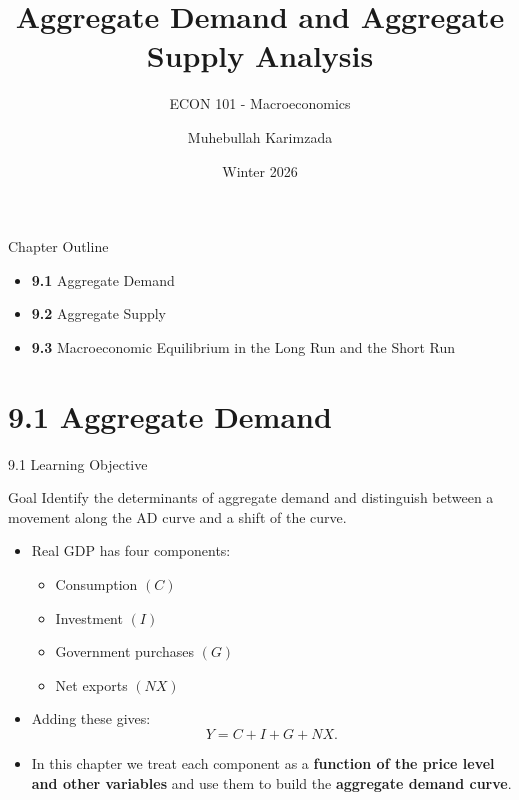 \documentclass[aspectratio=169]{beamer}
\title{\textbf{Aggregate Demand and Aggregate Supply Analysis \vspace{.5cm}\\  }}
\subtitle{ {\large ECON 101 - Macroeconomics}}
\author{Muhebullah Karimzada}
\date{Winter 2026}
\begin{document}
\begin{frame}[plain]
  \titlepage
\end{frame}

\begin{frame}{Chapter Outline}
\transfade
\begin{itemize}
  \item \textbf{9.1} Aggregate Demand
  \item \textbf{9.2} Aggregate Supply
  \item \textbf{9.3} Macroeconomic Equilibrium in the Long Run and the Short Run
\end{itemize}
\end{frame}

\section{9.1 Aggregate Demand}

\begin{frame}{9.1 Learning Objective}
\transfade
\begin{block}{Goal}
Identify the determinants of aggregate demand and distinguish between a movement along the AD curve and a shift of the curve.
\end{block}
\begin{itemize}
  \item Real GDP has four components:
  \begin{itemize}
    \item Consumption \((C)\)
    \item Investment \((I)\)
    \item Government purchases \((G)\)
    \item Net exports \((NX)\)
  \end{itemize}
  \item Adding these gives:
  \[
    Y = C + I + G + NX.
  \]
  \item In this chapter we treat each component as a \textbf{function of the price level and other variables} and use them to build the \textbf{aggregate demand curve}.
\end{itemize}
\end{frame}
\end{document}
